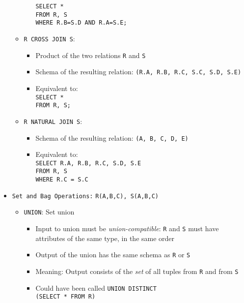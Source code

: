 \documentclass[landscape,8pt]{extarticle}
\newcommand{\code}{\lstinline}
\begin{document}
\begin{multicols}{4}
\begin{itemize}
\begin{itemize}
\begin{itemize}
            \code{SELECT *} \\
            \code{FROM R, S} \\
            \code{WHERE R.B=S.D AND R.A=S.E;}
        \end{itemize}
        \item \code{R CROSS JOIN S}:
        \begin{itemize}
            \item Product of the two relations \code{R} and \code{S}
            \item Schema of the resulting relation: \code{(R.A, R.B, R.C, S.C, S.D, S.E)}
            \item Equivalent to: \\
            \code{SELECT *} \\
            \code{FROM R, S;}
        \end{itemize}
        \item \code{R NATURAL JOIN S}:
        \begin{itemize}
            \item Schema of the resulting relation: \code{(A, B, C, D, E)}
            \item Equivalent to: \\
            \code{SELECT R.A, R.B, R.C, S.D, S.E} \\
            \code{FROM R, S} \\
            \code{WHERE R.C = S.C}
        \end{itemize}
    \end{itemize}
    \item \code{Set and Bag Operations:} \code{R(A,B,C), S(A,B,C)}
    \begin{itemize}
        \item \code{UNION}: Set union
        \begin{itemize}
            \item Input to union must be \emph{union-compatible}: \code{R} and \code{S} must have
            attributes of the same type, in the same order
            \item Output of the union has the same schema as \code{R} or \code{S}
            \item Meaning: Output consists of the \emph{set} of all tuples from \code{R} and from \code{S}
            \item Could have been called \code{UNION DISTINCT} \\
            \code{(SELECT * FROM R)} \\

\end{itemize}
\end{itemize}
\end{itemize}
\end{multicols}
\end{document}
